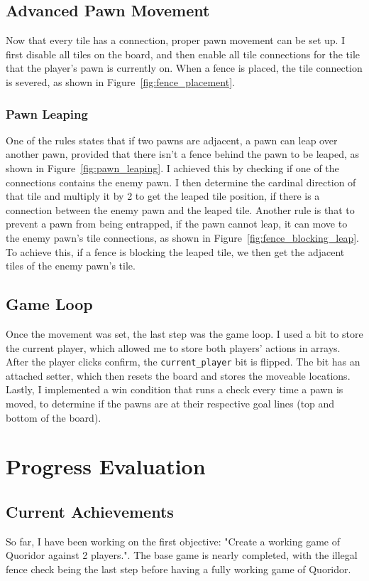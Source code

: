 \documentclass[progress]{cmpreport}
\begin{document}
\subsection{Advanced Pawn Movement}
Now that every tile has a connection, proper pawn movement can be set up. I first disable all tiles on the board, and then enable all tile connections for the tile that the player's pawn is currently on. When a fence is placed, the tile connection is severed, as shown in Figure~\ref{fig:fence_placement}.

\subsubsection{Pawn Leaping}
One of the rules states that if two pawns are adjacent, a pawn can leap over another pawn, provided that there isn't a fence behind the pawn to be leaped, as shown in Figure~\ref{fig:pawn_leaping}. I achieved this by checking if one of the connections contains the enemy pawn. I then determine the cardinal direction of that tile and multiply it by 2 to get the leaped tile position, if there is a connection between the enemy pawn and the leaped tile. Another rule is that to prevent a pawn from being entrapped, if the pawn cannot leap, it can move to the enemy pawn's tile connections, as shown in Figure~\ref{fig:fence_blocking_leap}. To achieve this, if a fence is blocking the leaped tile, we then get the adjacent tiles of the enemy pawn's tile.

\subsection{Game Loop}
Once the movement was set, the last step was the game loop. I used a bit to store the current player, which allowed me to store both players' actions in arrays. After the player clicks confirm, the \texttt{current\_player} bit is flipped. The bit has an attached setter, which then resets the board and stores the moveable locations. Lastly, I implemented a win condition that runs a check every time a pawn is moved, to determine if the pawns are at their respective goal lines (top and bottom of the board).

\section{Progress Evaluation}

\subsection{Current Achievements}
So far, I have been working on the first objective: "Create a working game of Quoridor against 2 players.". The base game is nearly completed, with the illegal fence check being the last step before having a fully working game of Quoridor.
\end{document}
